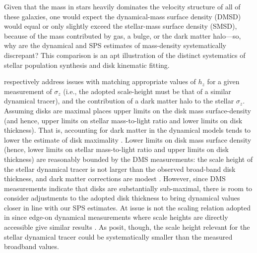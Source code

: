 Given that the mass in stars heavily dominates the velocity structure of all of these galaxies, one would expect the dynamical-mass surface density (DMSD) would equal or only slightly exceed the stellar-mass surface density (SMSD), because of the mass contributed by gas, a bulge, or the dark matter halo---so, why are the dynamical and SPS estimates of mass-density systematically discrepant? This comparison is an apt illustration of the distinct systematics of stellar population synthesis and disk kinematic fitting.

\citet{aniyan_freeman_16, aniyan_freeman_18} respectively address issues with matching appropriate values of $h_z$ for a given measurement of $\sigma_z$ (i.e., the adopted scale-height must be that of a similar dynamical tracer), and the contribution of a dark matter halo to the stellar $\sigma_z$. Assuming disks are maximal places upper limits on the disk mass surface-density (and hence, upper limits on stellar mass-to-light ratio and lower limits on disk thickness). That is, accounting for dark matter in the dynamical models tends to lower the estimate of disk maximality \citep{hessman_17}. Lower limits on disk mass surface density (hence, lower limits on stellar mass-to-light ratio and upper limits on disk thickness) are reasonably bounded by the DMS measurements: the scale height of the stellar dynamical tracer is not larger than the observed broad-band disk thickness, and dark matter corrections are modest \citep{diskmass_iii, swaters_14}. However, since DMS measurements indicate that disks are substantially sub-maximal, there is room to consider adjustments to the adopted disk thickness to bring dynamical values closer in line with our SPS estimates. At issue is not the scaling relation adopted in \citet{diskmass_ii} since edge-on dynamical measurements where scale heights are directly accessible give similar results \citep{bershady_11}. As \citep{aniyan_freeman_16} posit, though, the scale height relevant for the stellar dynamical tracer could be systematically smaller than the measured broadband values.

